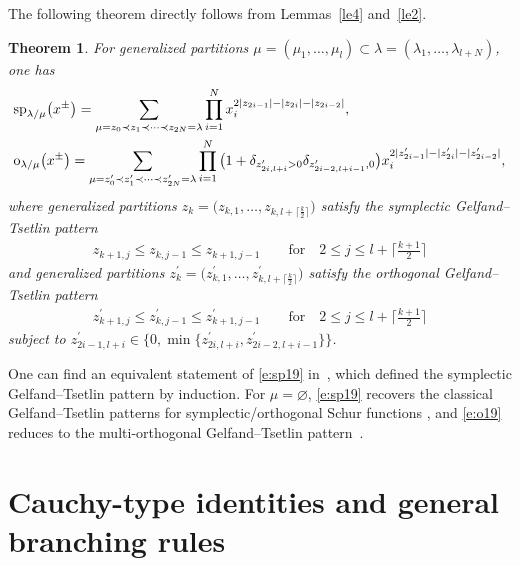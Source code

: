 \documentclass[pdftex]{sigma}
\numberwithin{equation}{section}
\newtheorem{Theorem}{Theorem}[section]
\begin{document}
The following theorem directly follows from Lemmas~\ref{le4} and~\ref{le2}.
\begin{Theorem}
For generalized partitions $\mu=(\mu_1,\dots,\mu_l)\subset \lambda=(\lambda_1,\dots,\lambda_{l+N})$, one has
\begin{align}
\label{e:sp19}&{\rm sp}_{\lambda/\mu}\big(x^{\pm}\big) = \sum_{\mu=z_0\prec z_1\prec\dots\prec z_{2N}=\lambda}\prod^N_{i=1}x^{2|z_{2i-1}|-|z_{2i}|-|z_{2i-2}|}_i,\\
\label{e:o19}&{\rm o}_{\lambda/\mu}\big(x^{\pm}\big) = \sum_{\mu=z^{\prime}_0\prec z^{\prime}_1\prec\dots\prec z^{\prime}_{2N}=\lambda}\prod^N_{i=1}\big(1+\delta_{z^{\prime}_{2i,l+i}>0}\delta_{z^{\prime}_{2i-2,l+i-1},0}\big)x^{2|z^{\prime}_{2i-1}| -|z^{\prime}_{2i}|-|z^{\prime}_{2i-2}|}_i,
\end{align}
where generalized partitions $z_k=\big(z_{k,1},\dots,z_{k,l+\lceil\frac{k}{2}\rceil}\big)$ satisfy the symplectic Gelfand--Tsetlin pattern
\begin{align*}
z_{k+1,j}\leq z_{k,j-1}\leq z_{k+1,j-1}\qquad\text{for}\quad 2\leq j\leq l+\biggl\lceil \frac{k+1}{2}\biggr\rceil
\end{align*}
and generalized partitions $z^{\prime}_k=\big(z^{\prime}_{k,1},\dots,z^{\prime}_{k,l+\lceil\frac{ k}{2}\rceil}\big)$ satisfy the orthogonal Gelfand--Tsetlin pattern
\begin{align*}
z^{\prime}_{k+1,j}\leq z^{\prime}_{k,j-1}\leq z^{\prime}_{k+1,j-1}\qquad \text{for}\quad 2\leq j\leq l+\biggl\lceil\frac{k+1}{2}\biggr\rceil
\end{align*}
subject to $z^{\prime}_{2i-1,l+i}\in\big\{0,\min\big\{z^{\prime}_{2i,l+i},z^{\prime}_{2i-2,l+i-1}\big\}\big\}$.
\end{Theorem}
\begin{Remark}
One can find an equivalent statement of \eqref{e:sp19} in~\cite{AF2020}, which defined the symplectic Gelfand--Tsetlin pattern by induction. For $\mu=\varnothing$, \eqref{e:sp19} recovers the classical Gelfand--Tsetlin patterns for symplectic/orthogonal Schur functions \cite[p.~310]{Pro1994}, and \eqref{e:o19} reduces to the multi-orthogonal Gelfand--Tsetlin pattern~\cite[p.~324]{Pro1994}.
\end{Remark}

\section{Cauchy-type identities and general branching rules}\label{s5}
\end{document}
